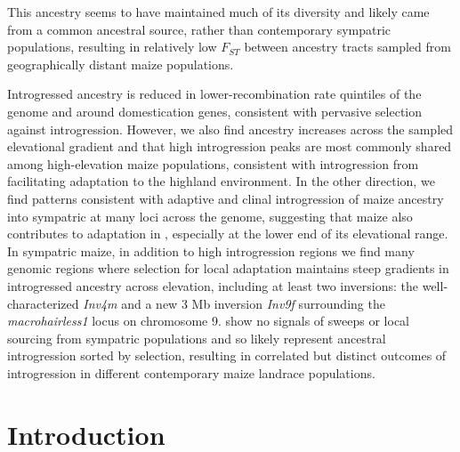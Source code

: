 This \mexicana ancestry seems to have maintained much of its diversity and likely came from a common ancestral source, rather than contemporary sympatric populations, resulting in relatively low $F_{ST}$ between \mexicana ancestry tracts sampled from geographically distant maize populations. 

Introgressed \mexicana ancestry is reduced in lower-recombination rate quintiles of the genome and around domestication genes, consistent with pervasive selection against introgression.
However, we also find \mexicana ancestry increases across the sampled elevational gradient and that high introgression peaks are most commonly shared among high-elevation maize populations, consistent with introgression from \mexicana facilitating adaptation to the highland environment. 
In the other direction, we find patterns consistent with adaptive and clinal introgression of maize ancestry into sympatric \mexicana at many loci across the genome, suggesting that maize also contributes to adaptation in \mexicana, especially at the lower end of its elevational range.
In sympatric maize, in addition to high introgression regions we find many genomic regions where selection for local adaptation maintains steep gradients in introgressed \mexicana ancestry across elevation, including at least two inversions: the well-characterized  \textit{Inv4m}  and a new 3 Mb inversion \textit{Inv9f} surrounding the \textit{macrohairless1} locus on chromosome 9. 
 show no signals of sweeps or local sourcing from sympatric populations and so likely represent ancestral introgression sorted by selection, resulting in correlated but distinct outcomes of introgression in different contemporary maize landrace populations.


\section*{Introduction}

